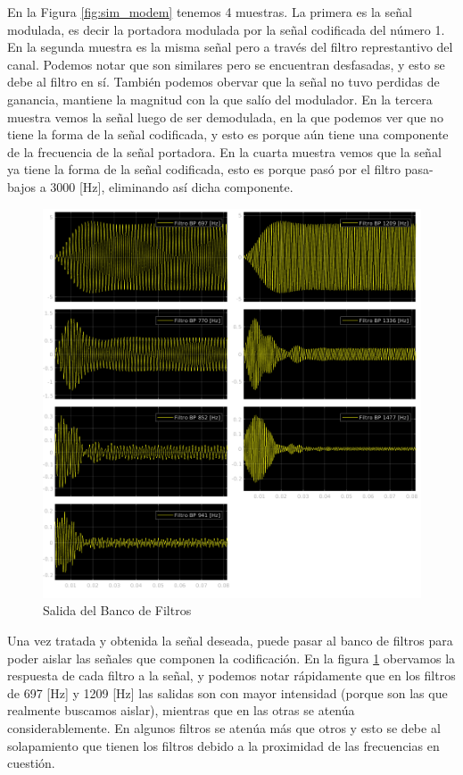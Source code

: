 En la Figura \ref{fig:sim_modem} tenemos 4 muestras. La primera es la señal modulada, es decir la portadora modulada por la señal codificada del número 1. En la segunda muestra es la misma señal pero a través del filtro represtantivo del canal. Podemos notar que son similares pero se encuentran desfasadas, y esto se debe al filtro en sí. También podemos obervar que la señal no tuvo perdidas de ganancia, mantiene la magnitud con la que salío del modulador. En la tercera muestra vemos la señal luego de ser demodulada, en la que podemos ver que no tiene la forma de la señal codificada, y esto es porque aún tiene una componente de la frecuencia de la señal portadora. En la cuarta muestra vemos que la señal ya tiene la forma de la señal codificada, esto es porque pasó por el filtro pasa-bajos a 3000 [Hz], eliminando así dicha componente.

\begin{figure}[!htb]
  \centering
  \includegraphics[width=\linewidth]{images/simulacion/extendido/bank.png}
  \caption{Salida del Banco de Filtros}
  \label{fig:sim_bank}
\end{figure}

Una vez tratada y obtenida la señal deseada, puede pasar al banco de filtros para poder aislar las señales que componen la codificación. En la figura \ref{fig:sim_bank} obervamos la respuesta de cada filtro a la señal, y podemos notar rápidamente que en los filtros de 697 [Hz] y 1209 [Hz] las salidas son con mayor intensidad (porque son las que realmente buscamos aislar), mientras que en las otras se atenúa considerablemente. En algunos filtros se atenúa más que otros y esto se debe al solapamiento que tienen los filtros debido a la proximidad de las frecuencias en cuestión.

